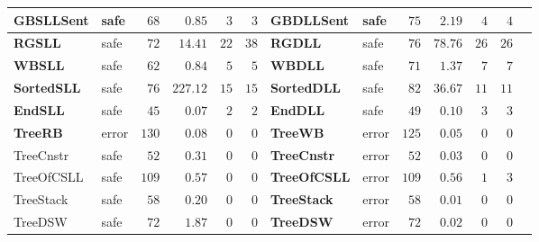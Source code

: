 \documentclass{beamer}
\newcommand{\hcol}[1]{yellow!20!orange!20}
\newcommand{\ucol}[1]{red!50}
\newcommand{\scol}[1]{blue!40}
\newcommand{\safe}[0]{safe}
\newcommand{\unsafe}[0]{error}
\begin{document}
\begin{frame}
\begin{center}
\begin{adjustbox}{max height=\textheight, max width=\textwidth}
\begin{tabular}{| l | l | r | r | r | r || l | l | r | r | r | r | r |}
        \hline
		\rowcolor{\hcol{}}
		\textbf{GBSLLSent}   & \cellcolor{\scol{}} \safe  & $68$ & $0.85$   &  $3$ & $3$ & \textbf{GBDLLSent} & \cellcolor{\scol{}} \safe & $75$ &  $2.19$  & $4$ & $4$ \\
        \hline
		\rowcolor{\hcol{}}
		\textbf{RGSLL}       & \cellcolor{\scol{}} \safe & $72$ & $14.41$  &  $22$  & $38$ & \textbf{RGDLL} & \cellcolor{\scol{}} \safe & $76$ &  $78.76$ & $26$ & $26$ \\
        \hline
		\rowcolor{\hcol{}}
		\textbf{WBSLL}       & \cellcolor{\scol{}} \safe & $62$ & $0.84$   &  $5$  & $5$ & \textbf{WBDLL} & \cellcolor{\scol{}} \safe & $71$ &  $1.37$  & $7$ & $7$ \\
        \hline
		\rowcolor{\hcol{}}
		\textbf{SortedSLL}   & \cellcolor{\scol{}} \safe & $76$ & $227.12$ &  $15$ & $15$ & \textbf{SortedDLL} & \cellcolor{\scol{}} \safe & $82$ &  $36.67$ & $11$ & $11$ \\
        \hline
		\rowcolor{\hcol{}}
		\textbf{EndSLL}      & \cellcolor{\scol{}} \safe  & $45$ & $0.07$   &  $2$  & $2$ & \textbf{EndDLL} & \cellcolor{\scol{}} \safe & $49$ &  $0.10$  & $3$ & $3$ \\
        \hline
		\rowcolor{\hcol{}}
		\textbf{TreeRB} & \cellcolor{\ucol{}}\unsafe & $130$ &  $0.08$  & $0$  & $0$ & \textbf{TreeWB} & \cellcolor{\ucol{}}\unsafe & $125$ &  $0.05$  & $0$ & $0$ \\
        \hline
		TreeCnstr & \cellcolor{\scol{}} \safe & $52$ & $0.31$  & $0$  & $0$ & \cellcolor{\hcol{}}\textbf{TreeCnstr} & \cellcolor{\ucol{}}\unsafe & \cellcolor{\hcol{}} $52$ & \cellcolor{\hcol{}} $0.03$  & \cellcolor{\hcol{}} $0$ & \cellcolor{\hcol{}} $0$ \\
        \hline
		TreeOfCSLL & \cellcolor{\scol{}} \safe & $109$ &  $0.57$  & $0$  & $0$ & \cellcolor{\hcol{}}\textbf{TreeOfCSLL}  & \cellcolor{\ucol{}}\unsafe & \cellcolor{\hcol{}} $109$ & \cellcolor{\hcol{}} $0.56$  & \cellcolor{\hcol{}} $1$ & \cellcolor{\hcol{}} $3$ \\
        \hline
		TreeStack & \cellcolor{\scol{}} \safe & $58$ &  $0.20$  & $0$  & $0$ & \cellcolor{\hcol{}}\textbf{TreeStack} & \cellcolor{\ucol{}}\unsafe & \cellcolor{\hcol{}} $58$ & \cellcolor{\hcol{}} $0.01$  & \cellcolor{\hcol{}} $0$ & \cellcolor{\hcol{}} $0$ \\
        \hline
		TreeDSW   & \cellcolor{\scol{}} \safe & $72$ & $1.87$  & $0$  & $0$ & \cellcolor{\hcol{}}\textbf{TreeDSW} & \cellcolor{\ucol{}}\unsafe & \cellcolor{\hcol{}} $72$ & \cellcolor{\hcol{}} $0.02$  & \cellcolor{\hcol{}} $0$ &  \cellcolor{\hcol{}} $0$ \\

\end{tabular}
\end{adjustbox}
\end{center}
\end{frame}
\end{document}
